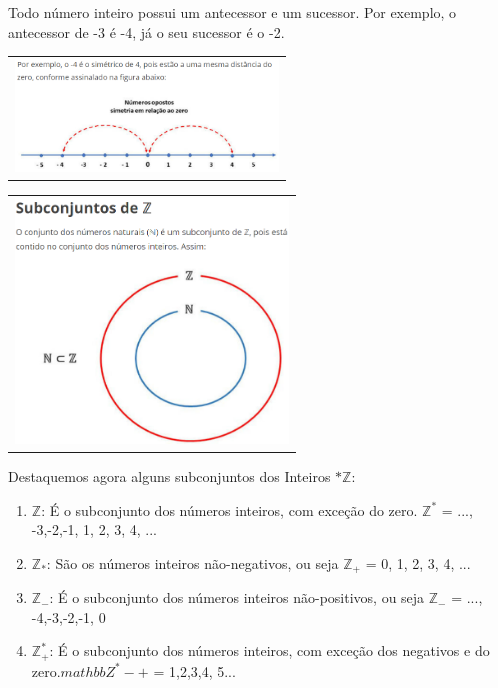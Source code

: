 \begin{multicols*}{2}
    Todo número inteiro possui um antecessor e um sucessor. Por exemplo, o antecessor de -3 é -4, já o seu sucessor é o -2.\\

    \begin{tabular}{@{}c@{}}
        \includegraphics[height=30mm]{assets/Reta Conjunto dos Inteiros.png}
    \end{tabular}


    \begin{tabular}{@{}c@{}}
        \includegraphics[height=65mm]{assets/Conjunto dos Inteiros Mais os Naturais Nele Contido.png}
    \end{tabular}

    Destaquemos agora alguns subconjuntos dos Inteiros $*\mathbb{Z}$:

    \begin{enumerate}

        \item $\mathbb{Z}$: É o subconjunto dos números inteiros, com exceção do zero. $\mathbb{Z}^* $ = {..., -3,-2,-1, 1, 2, 3, 4, ...}

        \item $\mathbb{Z}_*$: São os números inteiros não-negativos, ou seja $\mathbb{Z}_+ $ = {0, 1, 2, 3, 4, ...}

        \item $\mathbb{Z}_-$: É o subconjunto dos números inteiros não-positivos, ou seja $\mathbb{Z}_- $ = {..., -4,-3,-2,-1, 0}

        \item $\mathbb{Z}^*_+$: É o subconjunto dos números inteiros, com exceção dos negativos e do zero.$mathbb{Z}^*-+ $ = {1,2,3,4, 5...}


\end{enumerate}
\end{multicols*}
